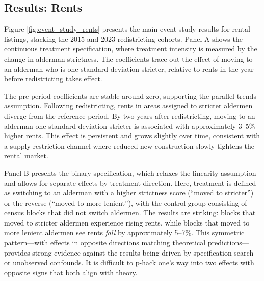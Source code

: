

\subsection{Results: Rents}
\label{sec:results_rents}

Figure \ref{fig:event_study_rents} presents the main event study results for rental listings, stacking the 2015 and 2023 redistricting cohorts. Panel A shows the continuous treatment specification, where treatment intensity is measured by the change in alderman strictness. The coefficients trace out the effect of moving to an alderman who is one standard deviation stricter, relative to rents in the year before redistricting takes effect.

The pre-period coefficients are stable around zero, supporting the parallel trends assumption. Following redistricting, rents in areas assigned to stricter aldermen diverge from the reference period. By two years after redistricting, moving to an alderman one standard deviation stricter is associated with approximately 3--5\% higher rents. This effect is persistent and grows slightly over time, consistent with a supply restriction channel where reduced new construction slowly tightens the rental market.

Panel B presents the binary specification, which relaxes the linearity assumption and allows for separate effects by treatment direction. Here, treatment is defined as switching to an alderman with a higher strictness score (``moved to stricter'') or the reverse (``moved to more lenient''), with the control group consisting of census blocks that did not switch aldermen. The results are striking: blocks that moved to stricter aldermen experience rising rents, while blocks that moved to more lenient aldermen see rents \emph{fall} by approximately 5--7\%. This symmetric pattern---with effects in opposite directions matching theoretical predictions---provides strong evidence against the results being driven by specification search or unobserved confounds. It is difficult to p-hack one's way into two effects with opposite signs that both align with theory.

